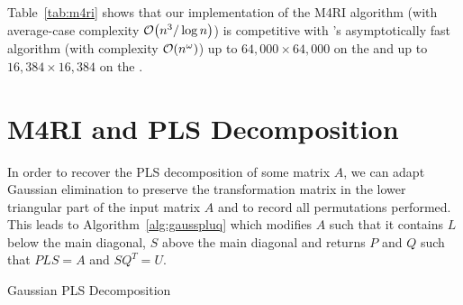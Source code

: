 Table~\ref{tab:m4ri} shows that our implementation of the M4RI algorithm (with average-case complexity $\mathcal{O}\!\left(n^3/\log n\right)$) is competitive with \Magma's asymptotically fast algorithm (with complexity $\mathcal{O}\!\left(n^\omega\right)$) up to $64,000 \times 64,000$ on the \CTD and up to $16,384 \times 16,384$ on the \Opteron.

\section{M4RI and PLS Decomposition}
\label{sec:mmpf}

In order to recover the PLS decomposition of some matrix $A$, we can adapt Gaussian elimination to preserve the transformation matrix in the lower triangular part of the input matrix $A$ and to record all permutations performed.
This leads to Algorithm~\ref{alg:gausspluq} which modifies $A$ such that it contains $L$ below the main diagonal, $S$ above the main diagonal and returns $P$ and $Q$ such that $P L S = A$ and $S Q^T = U$.

\begin{algorithm}
\caption{Gaussian PLS Decomposition}
\label{alg:gausspluq}
\end{algorithm}


